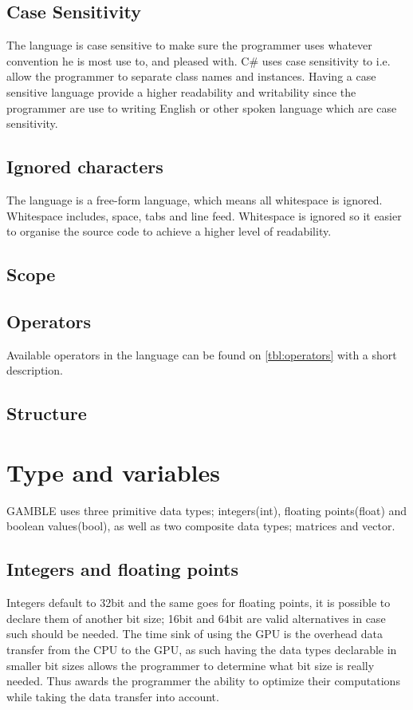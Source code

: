 \subsection{Case Sensitivity}
The language is case sensitive to make sure the programmer uses whatever convention he is most use to, and pleased with.
C\# uses case sensitivity to i.e. allow the programmer to separate class names and instances.
Having a case sensitive language provide a higher readability and writability since the programmer are use to writing English or other spoken language which are case sensitivity.

\subsection{Ignored characters}
The language is a free-form language, which means all whitespace is ignored.
Whitespace includes, space, tabs and line feed.
Whitespace is ignored so it easier to organise the source code to achieve a higher level of readability.

\subsection{Scope}

\subsection{Operators}
Available operators in the language can be found on \ref{tbl:operators} with a short description.
  

\subsection{Structure} 


\section{Type and variables}
GAMBLE uses three primitive data types; integers(int), floating points(float) and boolean values(bool), as well as two composite data types; matrices and vector.

\subsection{Integers and floating points}
Integers default to 32bit and the same goes for floating points, it is possible to declare them of another bit size; 16bit and 64bit are valid alternatives in case such should be needed.%
The time sink of using the GPU is the overhead data transfer from the CPU to the GPU, as such having the data types declarable in smaller bit sizes allows the programmer to determine what bit size is really needed.
Thus awards the programmer the ability to optimize their computations while taking the data transfer into account.

